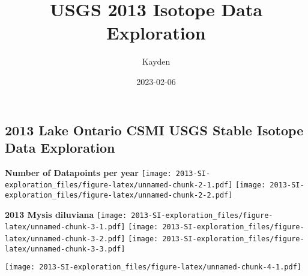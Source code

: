 \documentclass[
]{article}
\title{USGS 2013 Isotope Data Exploration}
\author{Kayden}
\date{2023-02-06}
\begin{document}
\maketitle

\hypertarget{lake-ontario-csmi-usgs-stable-isotope-data-exploration}{%
\subsection{2013 Lake Ontario CSMI USGS Stable Isotope Data
Exploration}\label{lake-ontario-csmi-usgs-stable-isotope-data-exploration}}

\textbf{Number of Datapoints per year}
\texttt{[image: 2013-SI-exploration\_files/figure-latex/unnamed-chunk-2-1.pdf]}
\texttt{[image: 2013-SI-exploration\_files/figure-latex/unnamed-chunk-2-2.pdf]}

\textbf{2013 Mysis diluviana }
\texttt{[image: 2013-SI-exploration\_files/figure-latex/unnamed-chunk-3-1.pdf]}
\texttt{[image: 2013-SI-exploration\_files/figure-latex/unnamed-chunk-3-2.pdf]}
\texttt{[image: 2013-SI-exploration\_files/figure-latex/unnamed-chunk-3-3.pdf]}

\texttt{[image: 2013-SI-exploration\_files/figure-latex/unnamed-chunk-4-1.pdf]}
\end{document}
